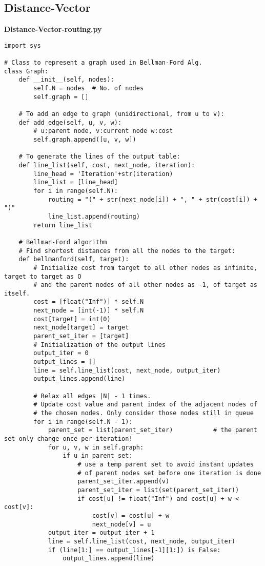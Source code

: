 \documentclass[12pt]{article}
\begin{document}
\subsection{Distance-Vector}
\noindent\textbf{Distance-Vector-routing.py}
\begin{verbatim}
import sys

# Class to represent a graph used in Bellman-Ford Alg.
class Graph:
    def __init__(self, nodes):
        self.N = nodes  # No. of nodes
        self.graph = []

    # To add an edge to graph (unidirectional, from u to v):
    def add_edge(self, u, v, w):
        # u:parent node, v:current node w:cost
        self.graph.append([u, v, w])      

    # To generate the lines of the output table:
    def line_list(self, cost, next_node, iteration):
        line_head = 'Iteration'+str(iteration)
        line_list = [line_head]
        for i in range(self.N):
            routing = "(" + str(next_node[i]) + ", " + str(cost[i]) + ")"
            line_list.append(routing)
        return line_list

    # Bellman-Ford algorithm
    # Find shortest distances from all the nodes to the target:
    def bellmanford(self, target):
        # Initialize cost from target to all other nodes as infinite, target to target as O
        # and the parent nodes of all other nodes as -1, of target as itself.
        cost = [float("Inf")] * self.N
        next_node = [int(-1)] * self.N
        cost[target] = int(0)
        next_node[target] = target
        parent_set_iter = [target]
        # Initialization of the output lines
        output_iter = 0
        output_lines = []
        line = self.line_list(cost, next_node, output_iter)
        output_lines.append(line)

        # Relax all edges |N| - 1 times.
        # Update cost value and parent index of the adjacent nodes of
        # the chosen nodes. Only consider those nodes still in queue
        for i in range(self.N - 1):
            parent_set = list(parent_set_iter)           # the parent set only change once per iteration!
            for u, v, w in self.graph:
                if u in parent_set:
                    # use a temp parent set to avoid instant updates
                    # of parent nodes set before one iteration is done
                    parent_set_iter.append(v)
                    parent_set_iter = list(set(parent_set_iter))
                    if cost[u] != float("Inf") and cost[u] + w < cost[v]:
                        cost[v] = cost[u] + w
                        next_node[v] = u
            output_iter = output_iter + 1
            line = self.line_list(cost, next_node, output_iter)
            if (line[1:] == output_lines[-1][1:]) is False:
                output_lines.append(line)


\end{verbatim}
\end{document}
